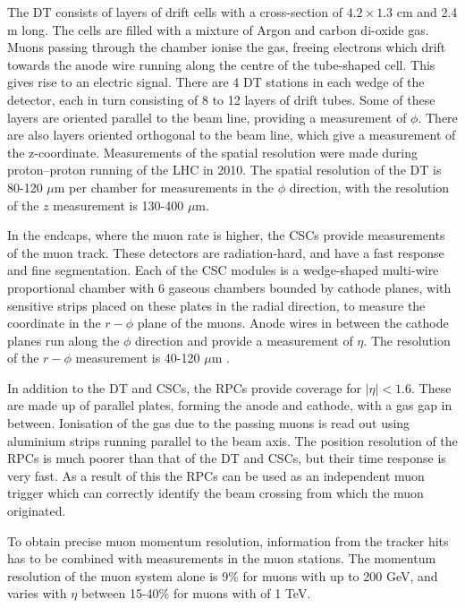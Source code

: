 The \ac{DT} consists of layers of drift cells with a cross-section of $4.2 \times 1.3$ cm and
2.4 m long. The cells are filled with a mixture of %
Argon and carbon di-oxide gas.
Muons passing through the chamber ionise the gas, freeing electrons
which drift towards the anode wire running along the centre of the tube-shaped cell. 
This gives rise to an electric signal. There are 4 \ac{DT} stations in each wedge of 
the detector, each in turn consisting of 8 to 12 layers of drift tubes. Some of
these layers are oriented parallel to the beam line, providing a measurement of $\phi$.
There are also layers oriented orthogonal to the beam line, which give a measurement
of the z-coordinate. Measurements of the spatial resolution were made
during proton--proton running of the \ac{LHC} in 2010.
The spatial resolution of the \ac{DT} is 80-120 $\mu$m per chamber for
measurements in the $\phi$ direction, with the resolution of the $z$ measurement
is 130-400 $\mu$m\cite{cms-muon-7tev}.

In the endcaps, where the muon rate is higher, the \ac{CSCs} provide
measurements of the muon track. These detectors are radiation-hard,
and have a fast response and fine segmentation.
Each of the CSC modules is a wedge-shaped
multi-wire proportional chamber %
with 6 gaseous chambers bounded by cathode planes, with
sensitive strips placed on these plates in the
radial direction, to measure the coordinate in the  $r-\phi$ plane
of the muons. Anode wires in between the cathode planes
run along the $\phi$ direction and provide a measurement of
$\eta$. The resolution of the $r-\phi$ measurement is 40-120 $\mu$m \cite{cms-muon-7tev}.

In addition to the \ac{DT} and \ac{CSCs}, the \ac{RPCs} provide coverage
for $|\eta|<1.6$. These are made up of parallel plates, forming the anode and cathode,
with a gas gap in between. Ionisation of the gas due to the passing
muons is read out using aluminium strips running parallel to the 
beam axis. The position resolution of the \ac{RPCs} is much poorer than
that of the \ac{DT} and \ac{CSCs}, but their time response is very fast. As
a result of this the \ac{RPCs} can be used as an independent muon trigger
which can correctly identify the beam crossing from which the muon
originated.

To obtain precise muon momentum resolution, information from 
the tracker hits has to be combined with measurements in the
muon stations. The momentum resolution of the muon system
alone is 9\% for muons with \pT up to 200 GeV, and varies with $\eta$ 
between 15-40\% for muons with \pT of 1 TeV.


